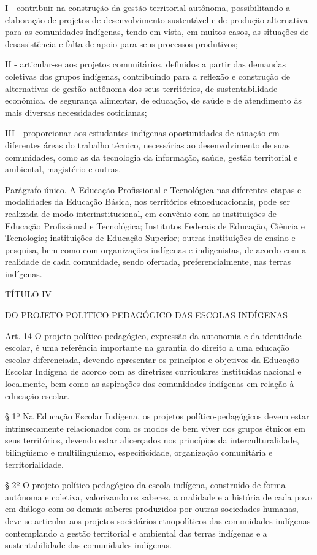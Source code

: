 \documentclass[
]{book}
\begin{document}
I - contribuir na construção da gestão territorial autônoma, possibilitando a elaboração de projetos de desenvolvimento sustentável e de produção alternativa para as comunidades indígenas, tendo em vista, em muitos casos, as situações de desassistência e falta de apoio para seus processos produtivos;

II - articular-se aos projetos comunitários, definidos a partir das demandas coletivas dos grupos indígenas, contribuindo para a reflexão e construção de alternativas de gestão autônoma dos seus territórios, de sustentabilidade econômica, de segurança alimentar, de educação, de saúde e de atendimento às mais diversas necessidades cotidianas;

III - proporcionar aos estudantes indígenas oportunidades de atuação em diferentes áreas do trabalho técnico, necessárias ao desenvolvimento de suas comunidades, como as da tecnologia da informação, saúde, gestão territorial e ambiental, magistério e outras.

Parágrafo único. A Educação Profissional e Tecnológica nas diferentes etapas e modalidades da Educação Básica, nos territórios etnoeducacionais, pode ser realizada de modo interinstitucional, em convênio com as instituições de Educação Profissional e Tecnológica; Institutos Federais de Educação, Ciência e Tecnologia; instituições de Educação Superior; outras instituições de ensino e pesquisa, bem como com organizações indígenas e indigenistas, de acordo com a realidade de cada comunidade, sendo ofertada, preferencialmente, nas terras indígenas.

TÍTULO IV

DO PROJETO POLITICO-PEDAGÓGICO DAS ESCOLAS INDÍGENAS

Art. 14 O projeto político-pedagógico, expressão da autonomia e da identidade escolar, é uma referência importante na garantia do direito a uma educação escolar diferenciada, devendo apresentar os princípios e objetivos da Educação Escolar Indígena de acordo com as diretrizes curriculares instituídas nacional e localmente, bem como as aspirações das comunidades indígenas em relação à educação escolar.

§ 1º Na Educação Escolar Indígena, os projetos político-pedagógicos devem estar intrinsecamente relacionados com os modos de bem viver dos grupos étnicos em seus territórios, devendo estar alicerçados nos princípios da interculturalidade, bilingüismo e multilinguismo, especificidade, organização comunitária e territorialidade.

§ 2º O projeto político-pedagógico da escola indígena, construído de forma autônoma e coletiva, valorizando os saberes, a oralidade e a história de cada povo em diálogo com os demais saberes produzidos por outras sociedades humanas, deve se articular aos projetos societários etnopolíticos das comunidades indígenas contemplando a gestão territorial e ambiental das terras indígenas e a sustentabilidade das comunidades indígenas.
\end{document}
